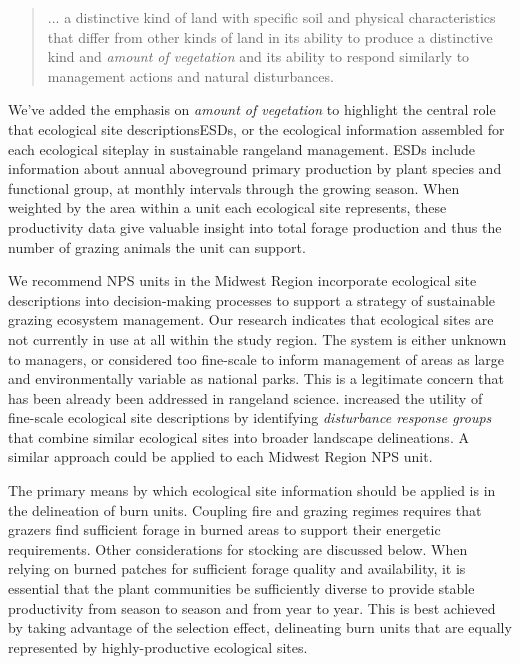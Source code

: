 \begin{quote}
	... a distinctive kind of land with specific soil and physical characteristics that differ from other kinds of land in its ability to produce a distinctive kind and \emph{amount of vegetation} and its ability to respond similarly to management actions and natural disturbances. 
\end{quote}

We've added the emphasis on \emph{amount of vegetation} to highlight the central role that ecological site descriptions\textemdash ESDs, or the ecological information assembled for each ecological site\textemdash play in sustainable rangeland management. 
ESDs include information about annual aboveground primary production by plant species and functional group, at monthly intervals through the growing season. 
When weighted by the area within a unit each ecological site represents, these productivity data give valuable insight into total forage production and thus the number of grazing animals the unit can support. 

We recommend NPS units in the Midwest Region incorporate ecological site descriptions into decision-making processes to support a strategy of sustainable grazing ecosystem management. 
Our research indicates that ecological sites are not currently in use at all within the study region. 
The system is either unknown to managers, or considered too fine-scale to inform management of areas as large and environmentally variable as national parks. 
This is a legitimate concern that has been already been addressed in rangeland science. 
\citet{stringham2016} increased the utility of fine-scale ecological site descriptions by identifying \emph{disturbance response groups} that combine similar ecological sites into broader landscape delineations. 
A similar approach could be applied to each Midwest Region NPS unit.

The primary means by which ecological site information should be applied is in the delineation of burn units. 
Coupling fire and grazing regimes requires that grazers find sufficient forage in burned areas to support their energetic requirements. 
Other considerations for stocking are discussed below. 
When relying on burned patches for sufficient forage quality and availability, it is essential that the plant communities be sufficiently diverse to provide stable productivity from season to season and from year to year. 
This is best achieved by taking advantage of the selection effect, delineating burn units that are equally represented by highly-productive ecological sites.
 
